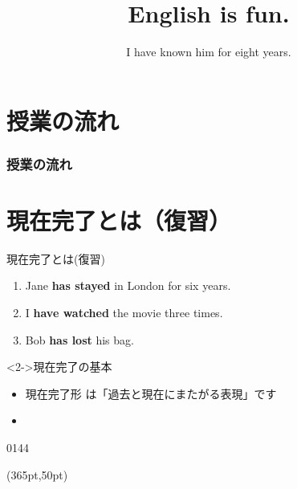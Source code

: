 \documentclass[aspectratio=169,xcolor={dvipsnames,table}]{beamer}
\title{English is fun.}
\subtitle{I have known him for eight years.}
\author{}
\institute[]{}
\date[]
\newcommand{\myaudio}[1]{\href{#1}{\faVolumeUp}}
\begin{document}
\begin{frame}[plain]
  \titlepage
\end{frame}

\section*{授業の流れ}
\begin{frame}[plain]
  \frametitle{授業の流れ}
  \tableofcontents
\end{frame}

\section*{現在完了とは（復習）}
\begin{frame}[plain]{現在完了とは(復習)}
 \begin{enumerate}
 \item Jane \textcolor{NavyBlue}{\bfseries has stayed} in London for six years.
 \item I \textcolor{NavyBlue}{\bfseries have watched} the movie three times.
 \item Bob \textcolor{NavyBlue}{\bfseries has lost} his bag.
\end{enumerate}

\vspace{30pt}

 \begin{block}<2->{現在完了の基本}
\small
\begin{itemize}[square]
 \item<3->  現在完了形\,\,は「過去と現在にまたがる表現」です\\
\hfill{}
 \item {}%
\end{itemize}
      \end{block}
\hfill{\tiny 0144}\,{\scriptsize \myaudio{./audio/012_have_pp_keizoku_01.mp3}}

\begin{textblock*}{0.4\linewidth}(365pt,50pt)
\end{textblock*}
\end{frame}
\end{document}
